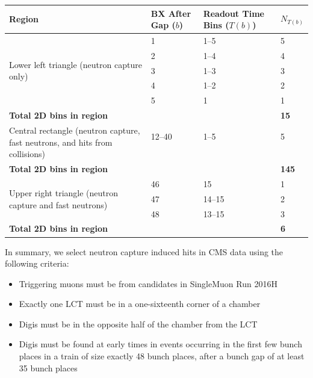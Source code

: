 \begin{table}
	\centering
	\label{tab:time_windows}
	\begin{tabular}{p{200pt}lll}
		Region & BX After Gap ($b$) & Readout Time Bins ($T(b)$) & $N_{T(b)}$ \\ \hline \hline
		\multirow{5}{200pt}{Lower left triangle \newline (neutron capture only)}
			& 1 & 1--5 & 5      \\
			& 2 & 1--4 & 4      \\
			& 3 & 1--3 & 3      \\
			& 4 & 1--2 & 2      \\
			& 5 & 1    & 1      \\
		\textbf{Total 2D bins in region} & & & \textbf{15}\\[.5em] \hline
		\multirow{3}{200pt}{Central rectangle (neutron capture, fast neutrons, and hits from \pp collisions)}
			& 12--40 & 1--5 & 5     \\
			& & &                   \\
			& & &                   \\
		\textbf{Total 2D bins in region} & & & \textbf{145}\\[.5em] \hline
		\multirow{3}{200pt}{Upper right triangle \newline (neutron capture and fast neutrons)}
			& 46 & 15     & 1   \\
			& 47 & 14--15 & 2   \\
			& 48 & 13--15 & 3   \\
		\textbf{Total 2D bins in region} & & & \textbf{6}\\[.5em] \hline
	\end{tabular}
\end{table}

In summary, we select neutron capture induced hits in CMS data using the following criteria:
\begin{itemize}
	\item Triggering muons must be from \ZMM candidates in SingleMuon Run 2016H
	\item Exactly one LCT must be in a one-sixteenth corner of a chamber
	\item Digis must be in the opposite half of the chamber from the LCT
	\item Digis must be found at early times in events occurring in the first few bunch places in a train of size exactly 48 bunch places, after a bunch gap of at least 35 bunch places
\end{itemize}

